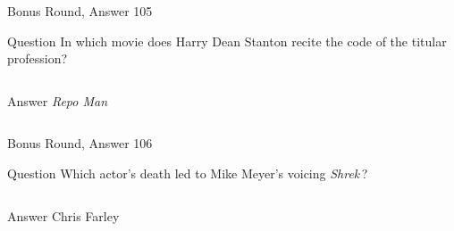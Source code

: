 \documentclass[11pt]{beamer}
\begin{document}
\begin{frame}[t]{Bonus Round, Answer 105}
  \vspace{2em}
  \begin{block}{Question}
    In which movie does Harry Dean Stanton recite the code of the titular profession?
  \end{block}
  \pause{}
  \begin{columns}[T,totalwidth=\linewidth]
    \begin{column}{0.35\linewidth}
      \begin{block}{Answer}
        \emph{Repo Man}
      \end{block}
    \end{column}
    \begin{column}{0.6\linewidth}
      \begin{center}
        \texttt{[image: \{Images/repo man]}.jpeg}
      \end{center}
    \end{column}
  \end{columns}
\end{frame}


\begin{frame}[t]{Bonus Round, Answer 106}
  \vspace{2em}
  \begin{block}{Question}
    Which actor's death led to Mike Meyer's voicing \emph{Shrek}\,?
  \end{block}
  \pause{}
  \begin{columns}[T,totalwidth=\linewidth]
    \begin{column}{0.35\linewidth}
      \begin{block}{Answer}
        Chris Farley
      \end{block}
    \end{column}
    \begin{column}{0.6\linewidth}
      \begin{center}
        \texttt{[image: \{Images/farley]}.jpg}
      \end{center}
    \end{column}
  \end{columns}
\end{frame}
\end{document}
